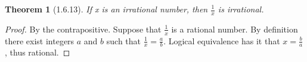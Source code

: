 \documentclass[a4paper, 12pt]{article}
\theoremstyle{plain}
\newtheorem*{theorem*}{Theorem}
\begin{document}
	
	\begin{theorem*}[1.6.13]
		If x is an irrational number, then $\frac{1}{x}$ is irrational.
	\end{theorem*}
	
	\begin{proof}
		By the contrapositive. Suppose that $\frac{1}{x}$ is a rational number. By definition there exist integers $a$ and $b$ such that  $\frac{1}{x} = \frac{a}{b}$. Logical equivalence has it that $x = \frac{b}{a}$, thus rational.
	\end{proof}
\end{document}

